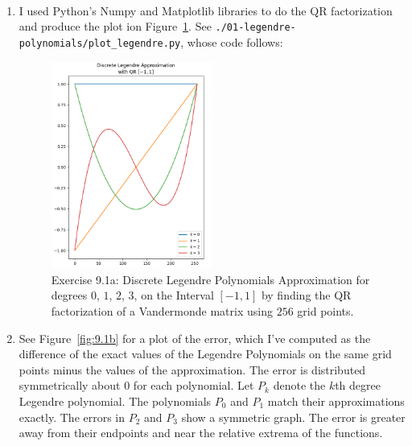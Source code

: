 \documentclass[12pt]{article}
\newenvironment{sol}[1][Solution]{\begin{trivlist}
		\item[\hskip \labelsep {\bfseries #1:}]}{\end{trivlist}}
\begin{document}
\begin{sol}
	\
	\begin{enumerate}[label=(\alph*)]
		\item I used Python's Numpy and Matplotlib libraries to do the QR factorization and produce the plot ion Figure~\ref{fig:9.1a}. See \texttt{./01-legendre-polynomials/plot\_legendre.py}, whose code follows:
		
		\begin{figure}
			\centering
			\includegraphics[width=0.5\textwidth]{vandermonde-qr-discrete-legendre-approximation}
			\caption{Exercise 9.1a: Discrete Legendre Polynomials Approximation for degrees $0$, $1$, $2$, $3$,  on the Interval $[-1,1]$ by finding the QR factorization of a Vandermonde matrix using $256$ grid points.}
			\label{fig:9.1a}
		\end{figure}
		\item See Figure~\ref{fig:9.1b} for a plot of the error, which I've computed as the difference of the
		exact values of the Legendre Polynomials on the same grid points minus the values of the approximation.
		The error is distributed symmetrically about 0 for each polynomial. Let $P_k$ denote the $k$th degree
		Legendre polynomial. The polynomials $P_0$ and $P_1$ match their approximations exactly. The errors in
		$P_2$ and $P_3$ show a symmetric graph. The error is greater away from their endpoints and near the relative
		extrema of the functions.
		\begin{figure}
			\centering

\end{figure}
\end{enumerate}
\end{sol}
\end{document}
